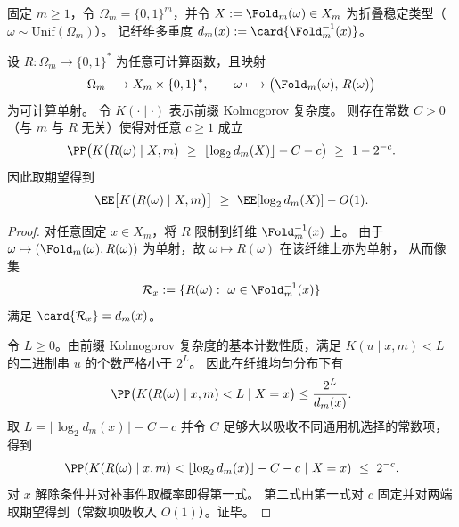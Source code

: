 \begin{theorem}\label{thm:pom-reversible-external-residual-kolmogorov-lower-bound}
固定 \(m\ge 1\)，令 \(\Omega_m=\{0,1\}^m\)，并令 \(X:=\Fold_m(\omega)\in X_m\) 为折叠稳定类型（\(\omega\sim\mathrm{Unif}(\Omega_m)\)）。
记纤维多重度 \(d_m(x):=\card{\Fold_m^{-1}(x)}\)。
\par
设 \(R:\Omega_m\to\{0,1\}^{\ast}\) 为任意可计算函数，且映射
\[
\Omega_m\longrightarrow X_m\times \{0,1\}^{\ast},
\qquad
\omega\longmapsto \bigl(\Fold_m(\omega),\,R(\omega)\bigr)
\]
为可计算单射。
令 \(K(\cdot\mid\cdot)\) 表示前缀 Kolmogorov 复杂度。
则存在常数 \(C>0\)（与 \(m\) 与 \(R\) 无关）使得对任意 \(c\ge 1\) 成立
\[
\PP\!\left(
K\bigl(R(\omega)\mid X,m\bigr)
\ \ge\
\left\lfloor \log_2 d_m(X)\right\rfloor-C-c
\right)\ \ge\ 1-2^{-c}.
\]
因此取期望得到
\[
\EE\!\left[K\bigl(R(\omega)\mid X,m\bigr)\right]
\ \ge\
\EE\!\left[\log_2 d_m(X)\right]-O(1).
\]
\end{theorem}

\begin{proof}
对任意固定 \(x\in X_m\)，将 \(R\) 限制到纤维 \(\Fold_m^{-1}(x)\) 上。
由于 \(\omega\mapsto(\Fold_m(\omega),R(\omega))\) 为单射，故 \(\omega\mapsto R(\omega)\) 在该纤维上亦为单射，
从而像集
\[
\mathcal R_x:=\{R(\omega):\ \omega\in\Fold_m^{-1}(x)\}
\]
满足 \(\card{\mathcal R_x}=d_m(x)\)。
\par
令 \(L\ge 0\)。由前缀 Kolmogorov 复杂度的基本计数性质，满足
\(
K(u\mid x,m)<L
\)
的二进制串 \(u\) 的个数严格小于 \(2^{L}\)。
因此在纤维均匀分布下有
\[
\PP\bigl(K(R(\omega)\mid x,m)<L\mid X=x\bigr)
\le \frac{2^{L}}{d_m(x)}.
\]
取
\(
L=\lfloor \log_2 d_m(x)\rfloor-C-c
\)
并令 \(C\) 足够大以吸收不同通用机选择的常数项，得到
\[
\PP\!\left(
K(R(\omega)\mid x,m)
<
\lfloor \log_2 d_m(x)\rfloor-C-c
\ \middle|\ X=x
\right)\ \le\ 2^{-c}.
\]
对 \(x\) 解除条件并对补事件取概率即得第一式。
第二式由第一式对 \(c\) 固定并对两端取期望得到（常数项吸收入 \(O(1)\)）。证毕。
\end{proof}

\endinput
